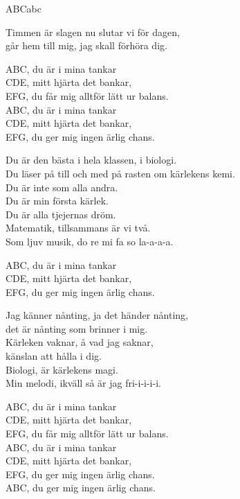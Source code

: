 \begin{song}{ABC}{abc}
\begin{vers}
Timmen är slagen nu slutar vi för dagen,\\
går hem till mig, jag skall förhöra dig.\\
\end{vers}
\begin{vers}
ABC, du är i mina tankar\\
CDE, mitt hjärta det bankar,\\
EFG, du får mig alltför lätt ur balans.\\
ABC, du är i mina tankar\\
CDE, mitt hjärta det bankar,\\
EFG, du ger mig ingen ärlig chans.\\
\end{vers}
\begin{vers}
Du är den bästa i hela klassen, i biologi.\\
Du läser på till och med på rasten om kärlekens kemi.\\
Du är inte som alla andra.\\
Du är min första kärlek.\\
Du är alla tjejernas dröm.\\
Matematik, tillsammans är vi två.\\
Som ljuv musik, do re mi fa so la-a-a-a.\\
\end{vers}
\begin{vers}
ABC, du är i mina tankar\\
CDE, mitt hjärta det bankar,\\
EFG, du ger mig ingen ärlig chans.\\
\end{vers}
\begin{vers}
Jag känner nånting, ja det händer nånting,\\
det är nånting som brinner i mig.\\
Kärleken vaknar, å vad jag saknar,\\
känslan att hålla i dig.\\
Biologi, är kärlekens magi.\\
Min melodi, ikväll så är jag fri-i-i-i-i.\\
\end{vers}
\begin{vers}
ABC, du är i mina tankar\\
CDE, mitt hjärta det bankar,\\
EFG, du får mig alltför lätt ur balans.\\
ABC, du är i mina tankar\\
CDE, mitt hjärta det bankar,\\
EFG, du ger mig ingen ärlig chans.\\
ABC, du ger mig ingen ärlig chans.\\
\end{vers}
\end{song}
